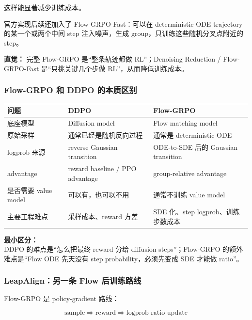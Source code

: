 这样能显著减少训练成本。

官方实现后续还加入了 Flow-GRPO-Fast：可以在 deterministic ODE trajectory 的某一个或两个中间 step 注入噪声，生成 group，只训练这些随机分叉点附近的 step。

\begin{intubox}
\textbf{直觉：} 完整 Flow-GRPO 是“整条轨迹都做 RL”；Denoising Reduction / Flow-GRPO-Fast 是“只挑关键几个步做 RL”，从而降低训练成本。
\end{intubox}

\subsubsection{Flow-GRPO 和 DDPO 的本质区别}

\begin{center}
{\small
\begin{tabular}{p{3cm}p{4.8cm}p{4.8cm}}
\hline
\textbf{问题} & \textbf{DDPO} & \textbf{Flow-GRPO} \\
\hline
底座模型
&
Diffusion model
&
Flow matching model
\\
原始采样
&
通常已经是随机反向过程
&
通常是 deterministic ODE
\\
logprob 来源
&
reverse Gaussian transition
&
ODE-to-SDE 后的 Gaussian transition
\\
advantage
&
reward baseline / PPO advantage
&
group-relative advantage
\\
是否需要 value model
&
可以有，也可以不用
&
通常不训练 value model
\\
主要工程难点
&
采样成本、reward 方差
&
SDE 化、step logprob、训练步数成本
\\
\hline
\end{tabular}
}
\end{center}

\begin{summarybox}
\textbf{最小区分：}\\
DDPO 的难点是“怎么把最终 reward 分给 diffusion steps”；Flow-GRPO 的额外难点是“Flow ODE 先天没有 step probability，必须先变成 SDE 才能做 ratio”。
\end{summarybox}

\subsubsection{LeapAlign：另一条 Flow 后训练路线}

Flow-GRPO 是 policy-gradient 路线：

\[
\text{sample}
\Rightarrow
\text{reward}
\Rightarrow
\text{logprob ratio update}
\]

